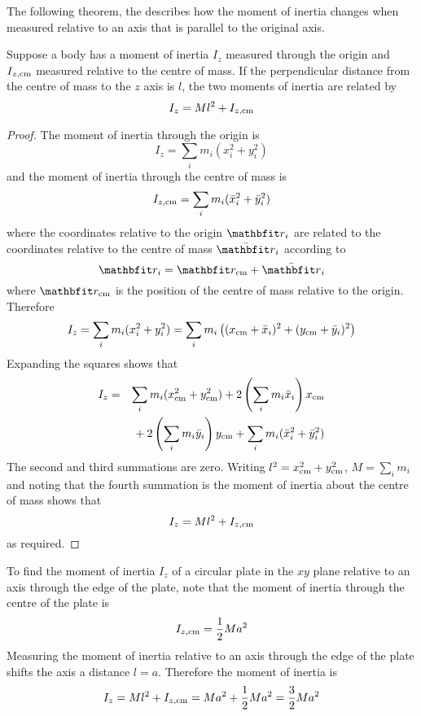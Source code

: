 The following theorem, the  describes how the
moment of inertia changes when measured relative to an axis that is
parallel to the original axis.

\begin{theorem}
Suppose a body has a moment of inertia $I_z$ measured through the origin and 
$I_{z,\rm cm}$ measured relative to the centre of mass.  If the
perpendicular distance from the centre of mass to the $z$ axis is $l$, 
the two moments of inertia are related by
$$I_z=Ml^2+I_{z,\rm cm}$$
\end{theorem}
\begin{proof}
The moment of inertia through the origin is
$$I_z=\sum_i m_i(x_i^2+y_i^2)$$
and the moment of inertia through the centre of mass is
$$I_{z,\rm cm}=\sum_i m_i(\bar{x}_i^2+\bar{y}_i^2)$$
where the coordinates relative to the origin $\vect{r}_i$ are related to the
coordinates relative to the centre of mass $\bar{\vect{r}}_i$ according to
$$\vect{r}_i=\vect{r}_{\rm cm}+\bar{\vect{r}}_i$$
where $\vect{r}_{\rm cm}$ is the position of the centre of mass relative to
the origin.  Therefore
$$I_z=\sum_i m_i(x_i^2+y_i^2)
=\sum_i m_i\left((x_{\rm cm}+\bar{x}_i)^2+(y_{\rm cm}+\bar{y}_i)^2\right)$$
Expanding the squares shows that
\begin{eqnarray*}
I_z&=&\sum_i m_i(x_{\rm cm}^2+y_{\rm cm}^2)
+2\left(\sum_i m_i\bar{x}_i\right)x_{\rm cm}\\
&&{}+2\left(\sum_i m_i\bar{y}_i\right)y_{\rm cm}
+\sum_i m_i(\bar{x}_i^2+\bar{y}_i^2)
\end{eqnarray*}
The second and third summations are zero.  Writing 
$l^2=x_{\rm cm}^2+y_{\rm cm}^2$, $M=\sum_i m_i$ and noting that the fourth 
summation is the moment of inertia about the centre of mass shows that
$$I_z=Ml^2+I_{z,\rm cm}$$
as required.
\end{proof}

\begin{example}
To find the moment of inertia $I_z$ of a circular plate in the $xy$ plane
relative to an axis through the edge of the plate, note that the moment of
inertia through the centre of the plate is
$$I_{z,\rm cm}=\frac{1}{2}Ma^2$$
Measuring the moment of inertia relative to an axis through the edge of the
plate shifts the axis a distance $l=a$.  Therefore the moment of inertia is
$$I_z=Ml^2+I_{z,\rm cm}=Ma^2+\frac{1}{2}Ma^2=\frac{3}{2}Ma^2$$
\end{example}

